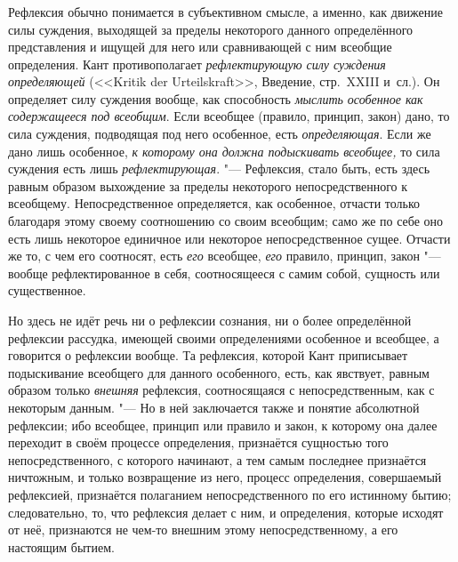 \subsubsection[Примечание]{}

Рефлексия обычно понимается в субъективном смысле, а именно, как движение
силы суждения, выходящей за пределы некоторого данного определённого
представления и ищущей для него или сравнивающей с ним всеобщие
определения. Кант противополагает {\em рефлектирующую
силу суждения определяющей} (<<Kritik der Urteils\-kraft>>, Введение,
стр.~XXIII и~сл.).
Он определяет силу суждения вообще, как способность
{\em мыслить особенное как содержащееся под всеобщим}.
Если всеобщее (правило, принцип, закон) дано, то сила суждения, подводящая
под него особенное, есть {\em определяющая}. Если же
дано лишь особенное, {\em к которому она должна
подыскивать всеобщее,} то сила суждения есть лишь
{\em рефлектирующая}.
"--- Рефлексия, стало быть, есть здесь равным образом выхождение за пределы
некоторого непосредственного к всеобщему. Непосредственное определяется,
как особенное, отчасти только благодаря этому своему соотношению со своим
всеобщим; само же по себе оно есть лишь некоторое единичное или некоторое
непосредственное сущее. Отчасти же то, с чем его соотносят, есть
{\em его} всеобщее, {\em его}
правило, принцип, закон "--- вообще рефлектированное в себя, соотносящееся с
самим собой, сущность или существенное.

Но здесь не идёт речь ни о рефлексии сознания, ни о более определённой
рефлексии рассудка, имеющей своими определениями особенное и всеобщее, а
говорится о рефлексии вообще. Та рефлексия, которой Кант приписывает
подыскивание всеобщего для данного особенного, есть, как явствует, равным
образом только {\em внешняя} рефлексия, соотносящаяся с
непосредственным, как с некоторым данным. "--- Но в ней заключается также и
понятие абсолютной рефлексии; ибо всеобщее, принцип или правило и закон, к
которому она далее переходит в своём процессе определения, признаётся
сущностью того непосредственного, с которого начинают, а тем самым
последнее признаётся ничтожным, и только возвращение из него, процесс
определения, совершаемый рефлексией, признаётся полаганием
непосредственного по его истинному бытию; следовательно, то, что рефлексия
делает с ним, и определения, которые исходят от неё, признаются не чем-то
внешним этому непосредственному, а его настоящим бытием.

